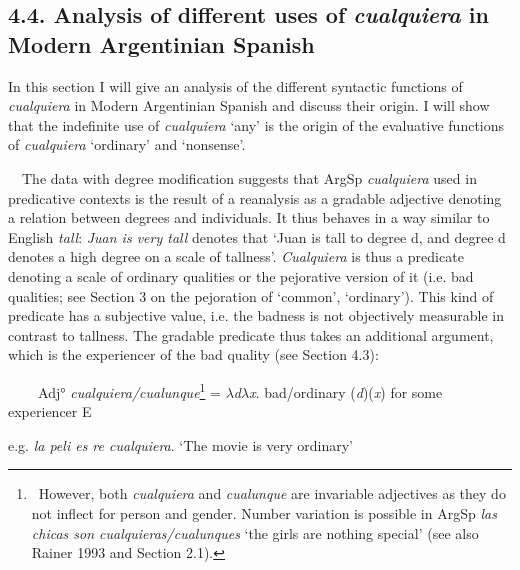 \subsection[4.4. Analysis of different uses of cualquiera in Modern Argentinian Spanish]{\textbf{4.4. Analysis of different uses of }\textbf{\textit{cualquiera}}\textbf{\textit{ }}\textbf{in Modern Argentinian Spanish}}
\begin{styleStandard}
In this section I will give an analysis of the different syntactic functions of \textit{cualquiera} in Modern Argentinian Spanish and discuss their origin. I will show that the indefinite use of \textit{cualquiera} ‘any’ is the origin of the evaluative functions of \textit{cualquiera} ‘ordinary’ and ‘nonsense’.
\end{styleStandard}

\begin{styleStandard}
\ \ The data with degree modification suggests that ArgSp \textit{cualquiera} used in predicative contexts is the result of a reanalysis as a gradable adjective denoting a relation between degrees and individuals. It thus behaves in a way similar to English \textit{tall}: \textit{Juan is very tall} denotes that ‘Juan is tall to degree d, and degree d denotes a high degree on a scale of tallness’. \textit{Cualquiera} is thus a predicate denoting a scale of ordinary qualities or the pejorative version of it (i.e. bad qualities; see Section 3 on the pejoration of ‘common’, ‘ordinary’). This kind of predicate has a subjective value, i.e. the badness is not objectively measurable in contrast to tallness. The gradable predicate thus takes an additional argument, which is the experiencer of the bad quality (see Section 4.3):
\end{styleStandard}

\begin{styleStandard}
\textbf{\ \ }\ \ Adj° \textit{cualquiera/cualunque}\footnote{\textrm{\ However, both }\textrm{\textit{cualquiera}}\textrm{ and }\textrm{\textit{cualunque}}\textrm{ are invariable adjectives as they do not inflect for person and gender. Number variation is possible in ArgSp }\textrm{\textit{las chicas son cualquieras/cualunques}}\textrm{ ‘the girls are nothing special’ (see also Rainer 1993 and Section 2.1).}}\textit{ }= \textit{$\lambda $d$\lambda $x}. bad/ordinary\textbf{ }(\textit{d})(\textit{x}) for some experiencer E
\end{styleStandard}

\begin{styleStandard}
e.g. \textit{la peli es re cualquiera}. ‘The movie is very ordinary’
\end{styleStandard}

